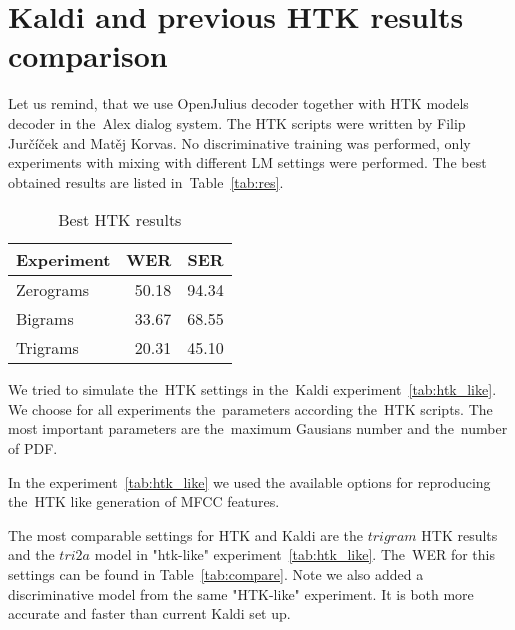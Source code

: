 
\section[Kaldi and \acs{HTK} comparison]{Kaldi and previous \ac{HTK} results comparison} 
\label{sec:compare}

Let us remind, that we use OpenJulius decoder together with HTK models decoder in the~Alex dialog system.
The \ac{HTK} scripts were written by Filip Jurčíček and Matěj Korvas. No discriminative training was performed,
only experiments with mixing with different \acl{LM} settings were performed. 
The best obtained results are listed in~Table~\ref{tab:res}.

\begin{table}[!htp]\label{tab:htk_res}\centering\begin{tabular}{l|rr}
Experiment      & \ac{WER} & \ac{SER} \\
\hline
    Zerograms      & 50.18  & 94.34  \\
    Bigrams        & 33.67  & 68.55  \\
    Trigrams       & 20.31  & 45.10  \\
\end{tabular}
\caption{Best \ac{HTK} results}
\end{table}  


We tried to simulate the~\ac{HTK} settings in the~Kaldi experiment~\ref{tab:htk_like}.
We choose for all experiments the~parameters according the~\ac{HTK} scripts.
The most important parameters are the~maximum Gausians number and the~number of \acl{PDF}.

In the experiment~\ref{tab:htk_like} we used the available options for reproducing the~\ac{HTK} like generation
of \ac{MFCC} features.

The most comparable settings for \ac{HTK} and Kaldi are the $trigram$ \ac{HTK} results
and the $tri2a$ model in "htk-like" experiment~\ref{tab:htk_like}. 
The~\ac{WER} for this settings can be found in Table~\ref{tab:compare}.
Note we also added a discriminative model from the same "\ac{HTK}-like" experiment.
It is both more accurate and faster than current Kaldi set up.

